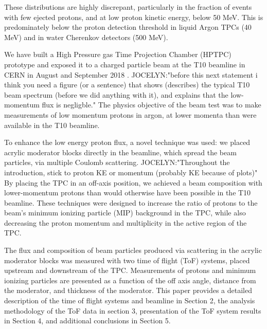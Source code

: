 These distributions are highly discrepant, particularly in the fraction of events with few ejected protons, and at low proton kinetic energy, below 50 MeV.
This is predominately below the proton detection threshold in liquid Argon TPCs (40 MeV) and in water Cherenkov detectors (500 MeV).

We have built a High Pressure gas Time Projection Chamber (HPTPC) prototype and exposed it to a charged particle beam at the T10 beamline in CERN in August and September 2018 \cite{SPSC-P-355}.
JOCELYN:"before this next statement i think you need a figure (or a sentence) that shows (describes) the typical T10 beam spectrum (before we did anything with it), and explains that the low-momentum flux is negligble."
The physics objective of the beam test was to make measurements of low momentum protons in argon, at lower momenta than were available in the T10 beamline. 

To enhance the low energy proton flux, a novel technique was used:
we placed acrylic moderator blocks directly in the beamline, which spread the beam particles, via multiple Coulomb scattering. JOCELYN:"Throughout the introduction, stick to proton KE or momentum (probably KE because of plots)"
By placing the TPC in an off-axis position, we achieved a beam composition with lower-momentum protons than would otherwise have been possible in the T10 beamline.
These techniques were designed to increase the ratio of protons to the beam's minimum ionizing particle (MIP) background in the TPC, while also decreasing the proton momentum and multiplicity in the active region of the TPC.

The flux and composition of beam particles produced via scattering in the acrylic moderator blocks was measured with two time of flight (ToF) systems, placed upstream and downstream of the TPC.
Measurements of protons and minimum ionizing particles are presented as a function of the off axis angle, distance from the moderator, and thickness of the moderator.
This paper provides a detailed description of the time of flight systems and beamline in Section 2,  the analysis methodology of the ToF data in section 3, presentation of the ToF system results in Section 4, and additional conclusions in Section 5.